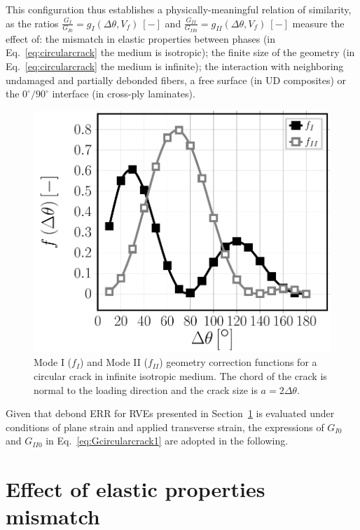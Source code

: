 \documentclass[review]{elsarticle}
\begin{document}
\begin{itemize}
This configuration thus establishes a physically-meaningful relation of similarity, as the ratios $\frac{G_{I}}{G_{I0}}=g_{I}\left(\Delta\theta,V_{f}\right)\ \left[-\right]$ and $\frac{G_{II}}{G_{II0}}=g_{II}\left(\Delta\theta,V_{f}\right)\ \left[-\right]$ measure the effect of: the mismatch in elastic properties between phases (in Eq.~\ref{eq:circularcrack} the medium is isotropic); the finite size of the geometry (in Eq.~\ref{eq:circularcrack} the medium is infinite); the interaction with neighboring undamaged and partially debonded fibers, a free surface (in UD composites) or the $0^{\circ}/90^{\circ}$ interface (in cross-ply laminates).
\end{itemize}

\begin{figure}
\includegraphics[width=\textwidth]{curvedcracks.pdf}
\caption{Mode I ($f_{I}$) and Mode II ($f_{II}$) geometry correction functions for a circular crack in infinite isotropic medium. The chord of the crack is normal to the loading direction and the crack size is $a=2\Delta\theta$.}\label{fig:curvedcrackgeomcorr}
\end{figure}

Given that debond ERR for RVEs presented in Section~\ref{} is evaluated under conditions of plane strain and applied transverse strain, the expressions of $G_{I0}$ and $G_{II0}$ in Eq.~\ref{eq:Gcircularcrack1} are adopted in the following.

\section{Effect of elastic properties mismatch}
\end{document}
